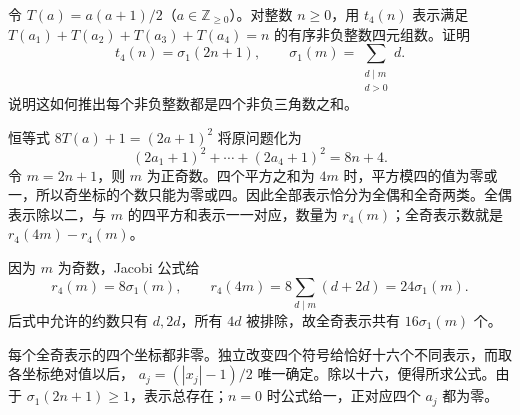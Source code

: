\begin{exercise}\label{b3:ex:24-2}
令 \(T(a)=a(a+1)/2\)（\(a\in\mathbb Z_{\ge0}\)）。对整数 \(n\ge0\)，用 \(t_4(n)\) 表示满足
\(T(a_1)+T(a_2)+T(a_3)+T(a_4)=n\) 的有序非负整数四元组数。证明
\[
t_4(n)=\sigma_1(2n+1),
\qquad \sigma_1(m)=\sum_{\substack{d\mid m\\d>0}}d.
\]
说明这如何推出每个非负整数都是四个非负三角数之和。
\end{exercise}
\begin{solution}
恒等式 \(8T(a)+1=(2a+1)^2\) 将原问题化为
\[
(2a_1+1)^2+\cdots+(2a_4+1)^2=8n+4.
\]
令 \(m=2n+1\)，则 \(m\) 为正奇数。四个平方之和为 \(4m\) 时，平方模四的值为零或一，所以奇坐标的个数只能为零或四。因此全部表示恰分为全偶和全奇两类。全偶表示除以二，与 \(m\) 的四平方和表示一一对应，数量为 \(r_4(m)\)；全奇表示数就是
\(r_4(4m)-r_4(m)\)。

因为 \(m\) 为奇数，Jacobi 公式给
\[
r_4(m)=8\sigma_1(m),\qquad
r_4(4m)=8\!\sum_{d\mid m}(d+2d)=24\sigma_1(m).
\]
后式中允许的约数只有 \(d,2d\)，所有 \(4d\) 被排除，故全奇表示共有 \(16\sigma_1(m)\) 个。

每个全奇表示的四个坐标都非零。独立改变四个符号给恰好十六个不同表示，而取各坐标绝对值以后，
\(a_j=(|x_j|-1)/2\) 唯一确定。除以十六，便得所求公式。由于 \(\sigma_1(2n+1)\ge1\)，表示总存在；\(n=0\) 时公式给一，正对应四个 \(a_j\) 都为零。
\end{solution}


